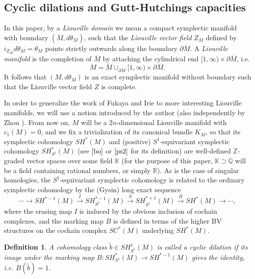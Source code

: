 \documentclass[a4paper]{article}
\newtheorem{definition}[theorem]{Definition}
\numberwithin{equation}{section}
\begin{document}
\subsection{Cyclic dilations and Gutt-Hutchings capacities}\label{section:GH}

In this paper, by a \textit{Liouville domain} we mean a compact symplectic manifold with boundary $(\overline{M},d\theta_M)$, such that the \textit{Liouville vector field} $Z_M$ defined by $i_{Z_M}d\theta_M=\theta_M$ points strictly outwards along the boundary $\partial\overline{M}$. A \textit{Liouville manifold} is the completion of $\overline{M}$ by attaching the cylindrical end $[1,\infty)\times\partial\overline{M}$, i.e.
\begin{equation}
M=\overline{M}\cup_{\partial\overline{M}}[1,\infty)\times\partial\overline{M}.
\end{equation}
It follows that $(M,d\theta_M)$ is an exact symplectic manifold without boundary such that the Liouville vector field $Z$ is complete.

In order to generalize the work of Fukaya and Irie to more interesting Liouville manifolds, we will use a notion introduced by the author \cite{yl2} (also independently by Zhou \cite{zz2}). From now on, $M$ will be a $2n$-dimensional Liouville manifold with $c_1(M)=0$, and we fix a trivialization of its canonical bundle $K_M$, so that its symplectic cohomology $\mathit{SH}^\ast(M)$ and (positive) $S^1$-equivariant symplectic cohomology $\mathit{SH}_{S^1}^\ast(M)$ (see $\cite{bo}$ or $\cite{ps2}$ for its definition) are well-defined $\mathbb{Z}$-graded vector spaces over some field $\mathbb{K}$ (for the purpose of this paper, $\mathbb{K}\supset\mathbb{Q}$ will be a field containing rational numbers, or simply $\mathbb{R}$). As is the case of singular homologies, the $S^1$-equivariant symplectic cohomology is related to the ordinary symplectic cohomology by the (Gysin) long exact sequence
\begin{equation}\label{eq:Gysin}
\cdots\rightarrow\mathit{SH}^{\ast-1}(M)\xrightarrow{I}\mathit{SH}_{S^1}^{\ast-1}(M)\xrightarrow{S}\mathit{SH}_{S^1}^{\ast+1}(M)\xrightarrow{B}\mathit{SH}^\ast(M)\rightarrow\cdots,
\end{equation}
where the erasing map $I$ is induced by the obvious inclusion of cochain complexes, and the marking map $B$ is defined in terms of the higher BV structures on the cochain complex $\mathit{SC}^\ast(M)$ underlying $\mathit{SH}^\ast(M)$.

\begin{definition}
A cohomology class $\tilde{b}\in\mathit{SH}_{S^1}^1(M)$ is called a cyclic dilation if its image under the marking map $B:\mathit{SH}_{S^1}^\ast(M)\rightarrow\mathit{SH}^{\ast-1}(M)$ gives the identity, i.e. $B(\tilde{b})=1$.
\end{definition}
\end{document}
